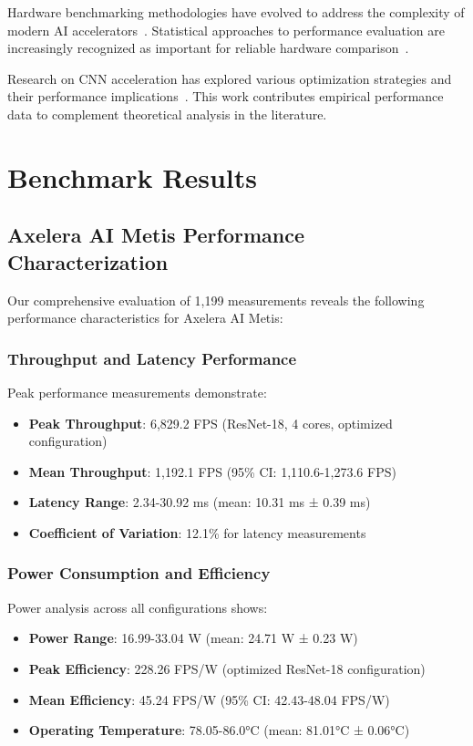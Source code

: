 \documentclass[12pt,draftcls,onecolumn]{IEEEtran}
\begin{document}
Hardware benchmarking methodologies have evolved to address the complexity of modern AI accelerators~\cite{fpga_accelerators2024}. Statistical approaches to performance evaluation are increasingly recognized as important for reliable hardware comparison~\cite{statistical_methods2023}.

Research on CNN acceleration has explored various optimization strategies and their performance implications~\cite{cnn_acceleration2024}. This work contributes empirical performance data to complement theoretical analysis in the literature.

\section{Benchmark Results}

\subsection{Axelera AI Metis Performance Characterization}

Our comprehensive evaluation of 1,199 measurements reveals the following performance characteristics for Axelera AI Metis:

\subsubsection{Throughput and Latency Performance}

Peak performance measurements demonstrate:
\begin{itemize}
    \item \textbf{Peak Throughput}: 6,829.2 FPS (ResNet-18, 4 cores, optimized configuration)
    \item \textbf{Mean Throughput}: 1,192.1 FPS (95\% CI: 1,110.6-1,273.6 FPS)
    \item \textbf{Latency Range}: 2.34-30.92 ms (mean: 10.31 ms ± 0.39 ms)
    \item \textbf{Coefficient of Variation}: 12.1\% for latency measurements
\end{itemize}

\subsubsection{Power Consumption and Efficiency}

Power analysis across all configurations shows:
\begin{itemize}
    \item \textbf{Power Range}: 16.99-33.04 W (mean: 24.71 W ± 0.23 W)
    \item \textbf{Peak Efficiency}: 228.26 FPS/W (optimized ResNet-18 configuration)
    \item \textbf{Mean Efficiency}: 45.24 FPS/W (95\% CI: 42.43-48.04 FPS/W)
    \item \textbf{Operating Temperature}: 78.05-86.0°C (mean: 81.01°C ± 0.06°C)
\end{itemize}
\end{document}
